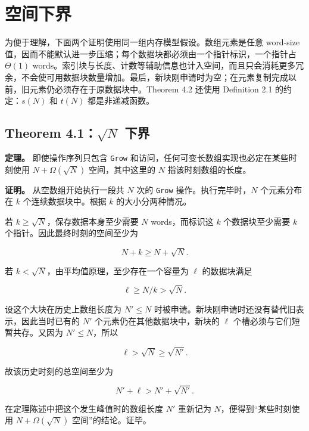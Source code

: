 \documentclass[UTF8,11pt,a4paper]{ctexart}
\begin{document}
\section{空间下界}

为便于理解，下面两个证明使用同一组内存模型假设。数组元素是任意 word-size 值，因而不能默认进一步压缩；每个数据块都必须由一个指针标识，一个指针占 $\Theta(1)$ words。索引块与长度、计数等辅助信息也计入空间，而且只会消耗更多冗余，不会使可用数据块数量增加。最后，新块刚申请时为空；在元素复制完成以前，旧元素仍必须存在于原数据块中。Theorem 4.2 还使用 Definition 2.1 的约定：$s(N)$ 和 $t(N)$ 都是非递减函数。\par

\subsection{\texorpdfstring{Theorem 4.1：$\sqrt{N}$ 下界}{Theorem 4.1：sqrt(N) 下界}}

\textbf{定理。} 即使操作序列只包含 \textnormal{\texttt{Grow}} 和访问，任何可变长数组实现也必定在某些时刻使用 $N+\Omega(\sqrt{N})$ 空间，其中这里的 $N$ 指该时刻数组的长度。\par

\textbf{证明。} 从空数组开始执行一段共 $N$ 次的 \textnormal{\texttt{Grow}} 操作。执行完毕时，$N$ 个元素分布在 $k$ 个连续数据块中。根据 $k$ 的大小分两种情况。\par

若 $k\geq \sqrt{N}$，保存数据本身至少需要 $N$ words，而标识这 $k$ 个数据块至少需要 $k$ 个指针。因此最终时刻的空间至少为\par

\[
  N+k \geq  N+\sqrt{N}.
\]

若 $k<\sqrt{N}$，由平均值原理，至少存在一个容量为 $\ell$ 的数据块满足\par

\[
  \ell \geq  N/k > \sqrt{N}.
\]

设这个大块在历史上数组长度为 $N'\leq N$ 时被申请。新块刚申请时还没有替代旧表示，因此当时已有的 $N'$ 个元素仍在其他数据块中，新块的 $\ell$ 个槽必须与它们短暂共存。又因为 $N'\leq N$，所以\par

\[
  \ell > \sqrt{N} \geq  \sqrt{N'}.
\]

故该历史时刻的总空间至少为\par

\[
  N'+\ell > N'+\sqrt{N'}.
\]

在定理陈述中把这个发生峰值时的数组长度 $N'$ 重新记为 $N$，便得到“某些时刻使用 $N+\Omega(\sqrt{N})$ 空间”的结论。证毕。\par
\end{document}
